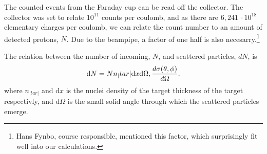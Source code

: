 The counted events from the Faraday cup can be read off the collector.
The collector was set to relate $10^{11}$ counts per coulomb, and as there are
$6,241\ \cdot10^{18}$ elementary charges per coulomb, we can relate the count
number to an amount of detected protons, $N$. Due to the beampipe, a factor of
one half is also necesarry.\footnote{Hans Fynbo, course responsible, mentioned
this factor, which surprisingly fit well into our calculations.}

The relation between the number of incoming, $N$, and scattered particles, $dN$, is
\begin{equation}\label{eq:dN}
    \mathrm{d}N = N n_|tar| \mathrm{d}x \mathrm{d}\Omega,
    \diff[d]{\sigma(\theta,\phi)}{\Omega}.
\end{equation}
\parencite[eq. 14.42, p. 582]{taylor} where $n_|tar|$ and $\mathrm{d}x$ is the
nuclei density of the target thickness of the target respectivly, and
$\mathrm{d}\Omega$ is the small solid angle through which the scattered
particles emerge.

